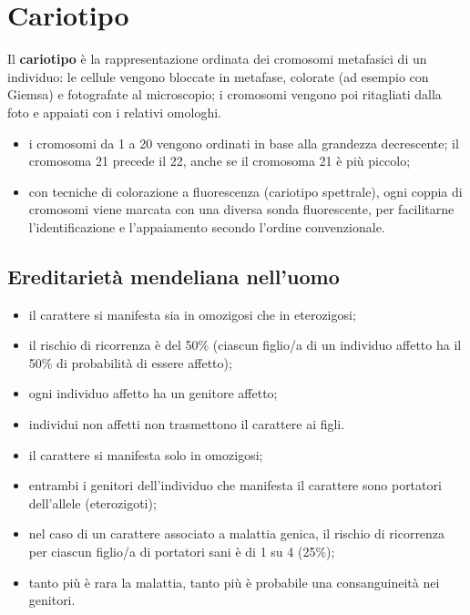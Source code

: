 \section{Cariotipo}

Il \textbf{cariotipo} è la rappresentazione ordinata dei cromosomi metafasici di un individuo: le cellule vengono bloccate in metafase, colorate (ad esempio con Giemsa) e fotografate al microscopio; i cromosomi vengono poi ritagliati dalla foto e appaiati con i relativi omologhi.
\begin{itemize}
  \item i cromosomi da 1 a 20 vengono ordinati in base alla grandezza decrescente; il cromosoma 21 precede il 22, anche se il cromosoma 21 è più piccolo;
  \item con tecniche di colorazione a fluorescenza (cariotipo spettrale), ogni coppia di cromosomi viene marcata con una diversa sonda fluorescente, per facilitarne l'identificazione e l'appaiamento secondo l'ordine convenzionale.
\end{itemize}

\subsection{Ereditarietà mendeliana nell'uomo}

\begin{itemize}
  \item il carattere si manifesta sia in omozigosi che in eterozigosi;
  \item il rischio di ricorrenza è del 50\% (ciascun figlio/a di un individuo affetto ha il 50\% di probabilità di essere affetto);
  \item ogni individuo affetto ha un genitore affetto;
  \item individui non affetti non trasmettono il carattere ai figli.
\end{itemize}

\begin{itemize}
  \item il carattere si manifesta solo in omozigosi;
  \item entrambi i genitori dell'individuo che manifesta il carattere sono portatori dell'allele (eterozigoti);
  \item nel caso di un carattere associato a malattia genica, il rischio di ricorrenza per ciascun figlio/a di portatori sani è di 1 su 4 (25\%);
  \item tanto più è rara la malattia, tanto più è probabile una consanguineità nei genitori.
\end{itemize}

